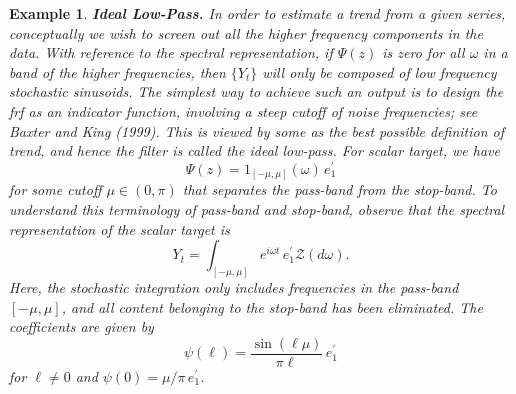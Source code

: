 \documentclass[a4paper]{book}
\newtheorem{Example}{Example}
\begin{document}
\begin{Example} {\bf Ideal Low-Pass.} \rm
\label{exam:ideal-low}
 In order to estimate a trend from a given series, conceptually we wish
 to screen out all the higher frequency components in the data.  With reference
 to the spectral representation, if $\Psi (z)$ is zero for all $\omega$ in a 
 band of the higher frequencies, then $\{ Y_t \}$ will only be composed of 
 low frequency stochastic sinusoids.  The simplest way to achieve such an output
 is to design the frf as an indicator function, involving 
  a steep cutoff of noise frequencies; see Baxter and King (1999).  This is
 viewed by some as the best possible definition of trend, and hence the filter is
 called the ideal low-pass.  For scalar target, we have
\[
  \Psi (z) = 1_{ [ -\mu, \mu ]} (\omega) \, e_1^{\prime}
\]
 for some cutoff $\mu \in (0, \pi)$ that separates the pass-band from
the stop-band.  To understand this terminology of pass-band and stop-band, observe
 that the spectral representation of the scalar target is
\[
  Y_t = \int_{ [-\mu, \mu]} e^{i \omega t} \, e_1^{\prime} 
  \mathcal{Z} (d\omega).
\]
  Here, the stochastic integration only includes frequencies in the pass-band 
 $[-\mu, \mu]$,  and all content belonging to the stop-band has been eliminated.
 The coefficients are given by 
\[ 
  \psi (\ell) = \frac{ \sin (\ell \mu) }{ \pi \ell } \, e_1^{\prime}
\]
 for $\ell \neq 0$ and $\psi (0) = \mu/\pi \, e_1^{\prime}$.   
\end{Example}
\end{document}
